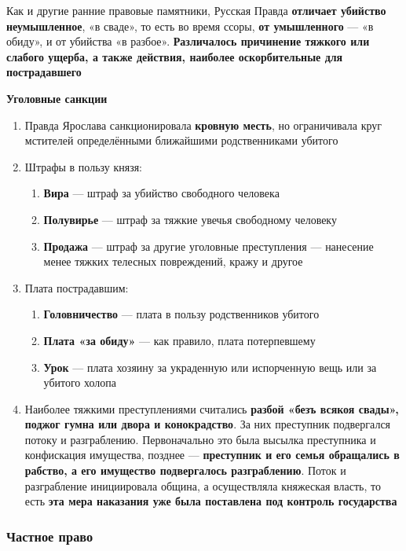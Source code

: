 \documentclass{article}
\begin{document}
Как и другие ранние правовые памятники, Русская Правда \textbf{отличает убийство неумышленное}, «в сваде», то есть во время ссоры, \textbf{от умышленного} — «в обиду», и от убийства «в разбое». \textbf{Различалось причинение тяжкого или слабого ущерба, а также действия, наиболее оскорбительные для пострадавшего}

\textbf{Уголовные санкции}

\begin{enumerate}
    \item Правда Ярослава санкционировала \textbf{кровную месть}, но ограничивала круг мстителей определёнными ближайшими родственниками убитого
    \item Штрафы в пользу князя:
    \begin{enumerate}
        \item \textbf{Вира} — штраф за убийство свободного человека
        \item \textbf{Полувирье} — штраф за тяжкие увечья свободному человеку
        \item \textbf{Продажа} — штраф за другие уголовные преступления — нанесение менее тяжких телесных повреждений, кражу и другое
    \end{enumerate}
    \item Плата пострадавшим:
    \begin{enumerate}
        \item \textbf{Головничество} — плата в пользу родственников убитого
        \item \textbf{Плата «за обиду»} — как правило, плата потерпевшему
        \item \textbf{Урок} — плата хозяину за украденную или испорченную вещь или за убитого холопа
    \end{enumerate}
    \item Наиболее тяжкими преступлениями считались \textbf{разбой «безъ всякоя свады», поджог гумна или двора и конокрадство}. За них преступник подвергался потоку и разграблению. Первоначально это была высылка преступника и конфискация имущества, позднее — \textbf{преступник и его семья обращались в рабство, а его имущество подвергалось разграблению}. Поток и разграбление инициировала община, а осуществляла княжеская власть, то есть \textbf{эта мера наказания уже была поставлена под контроль государства}
\end{enumerate}

\subsubsection{Частное право}
\end{document}
